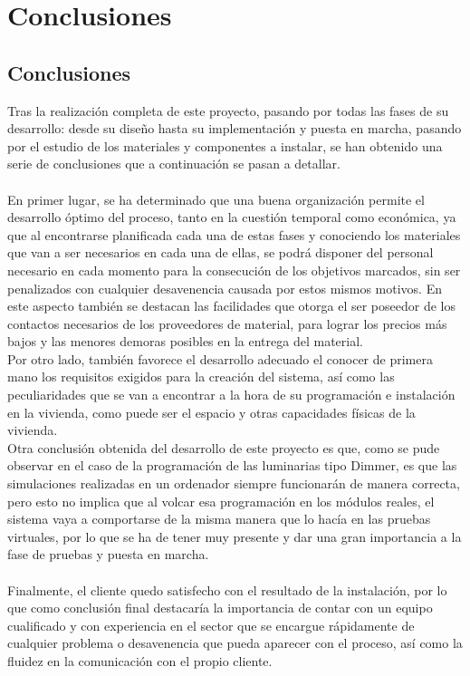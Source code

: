\chapter{Conclusiones}

\section{Conclusiones}

Tras la realización completa de este proyecto, pasando por todas las fases de su desarrollo: desde su diseño hasta su implementación y puesta en marcha, pasando por el estudio de los materiales y componentes a instalar, se han obtenido una serie de conclusiones que a continuación se pasan a detallar. \\\\
En primer lugar, se ha determinado que una buena organización permite el desarrollo óptimo del proceso, tanto en la cuestión temporal como económica, ya que al encontrarse planificada cada una de estas fases y conociendo los materiales que van a ser necesarios en cada una de ellas, se podrá disponer del personal necesario en cada momento para la consecución de los objetivos marcados, sin ser penalizados con cualquier desavenencia causada por estos mismos motivos. En este aspecto también se destacan las facilidades que otorga el ser poseedor de los contactos necesarios de los proveedores de material, para lograr los precios más bajos y las menores demoras posibles en la entrega del material.\\
Por otro lado, también favorece el desarrollo adecuado el conocer de primera mano los requisitos exigidos para la creación del sistema, así como las peculiaridades que se van a encontrar a la hora de su programación e instalación en la vivienda, como puede ser el espacio y otras capacidades físicas de la vivienda.\\
Otra conclusión obtenida del desarrollo de este proyecto es que, como se pude observar en el caso de la programación de las luminarias tipo Dimmer, es que las simulaciones realizadas en un ordenador siempre funcionarán de manera correcta, pero esto no implica que al volcar esa programación en los módulos reales, el sistema vaya a comportarse de la misma manera que lo hacía en las pruebas virtuales, por lo que se ha de tener muy presente y dar una gran importancia a la fase de pruebas y puesta en marcha.\\\\
Finalmente, el cliente quedo satisfecho con el resultado de la instalación, por lo que como conclusión final destacaría la importancia de contar con un equipo cualificado y con experiencia en el sector que se encargue rápidamente de cualquier problema o desavenencia que pueda aparecer con el proceso, así como la fluidez en la comunicación con el propio cliente.


